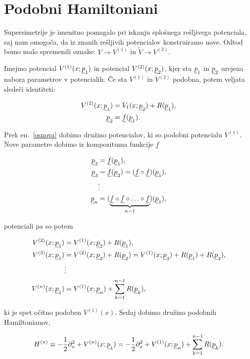 \section{Podobni Hamiltoniani}

Supersimetrije je imenitno pomagalo pri iskanju splo\v snega re\v sljivega potenciala, saj nam omogo\v ca, da iz znanih re\v sljivih
potencialov konstruiramo nove. Odtod bomo malo spremenili oznake: $V \to V^{(1)}$ in $\tilde{V} \to V^{(2)}$.

Imejmo potencial $V^{(1)} (x; \underline{p}_1)$ in potencial
$V^{(2)} (x; \underline{p}_2)$, kjer sta $\underline{p}_1$ in $\underline{p}_2$ urejena nabora parametrov v potencialih. \v Ce sta
$V^{(1)}$ in $V^{(2)}$ podobna, potem veljata slede\v ci identiteti:

\begin{align}
	V^{(2)} (x; \underline{p}_1) &= V_1 (x; \underline{p}_2) + R (\underline{p}_1), \\
	\underline{p}_2 &= \underline{f} (\underline{p}_1). \label{osnova}
\end{align}

\ni Prek en.~\eqref{osnova} dobimo dru\v zino potencialov, ki so podobni potencialu $V^{(1)}$. Nove parametre dobimo iz
kompozituma funkcije $\underline{f}$

\begin{align}
	\underline{p}_2 &= \underline{f} (\underline{p}_1), \notag \\
	\underline{p}_3 &= \underline{f} (\underline{p}_2) = (\underline{f} \circ \underline{f}) (\underline{p}_1), \notag \\
	&\vdots \notag \\
	\underline{p}_n &= (\underbrace{\underline{f} \circ \underline{f} \circ \ldots \circ \underline{f}}_{n-1}) (\underline{p}_1),
\end{align}

\ni potenciali pa so potem

\begin{align}
	V^{(2)} (x; \underline{p}_1) &= V^{(1)} (x; \underline{p}_2) + R (\underline{p}_1), \notag \\
	V^{(3)} (x; \underline{p}_1) &= V^{(2)} (x; \underline{p}_2) + R (\underline{p}_2) = V^{(1)} (x; \underline{p}_3) + R (\underline{p}_1) + R (\underline{p}_2), \notag \\
	&\vdots \notag \\
	V^{(n)} (x; \underline{p}_1) &= V^{(1)} (x; \underline{p}_n) + \sum_{k = 1}^{n-1} R (\underline{p}_k),
\end{align}

\ni ki je spet o\v citno podoben $V^{(1)} (x)$. Sedaj dobimo dru\v zino podobnih Hamiltonianov,

\begin{equation}
	H^{(n)} \equiv - \frac{1}{2}\partial_x^2 + V^{(n)} (x;\underline{p}_1) = - \frac{1}{2}\partial_x^2+V^{(1)}(x;\underline{p}_n)+\sum_{k = 1}^{n-1}R(\underline{p}_k).
\end{equation}


